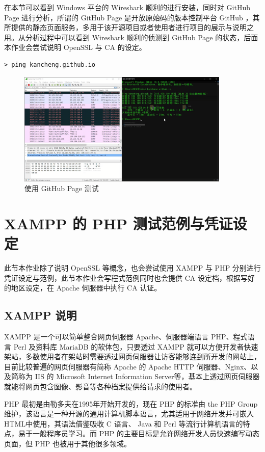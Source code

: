 在本节可以看到 Windows 平台的 Wireshark 顺利的进行安装，同时对 GitHub Page 进行分析，所谓的 GitHub Page 是开放原始码的版本控制平台 GitHub ，其所提供的静态页面服务，多用于该开源项目或者使用者进行项目的展示与说明之用。从分析过程中可以看到 Wireshark 顺利的侦测到 GitHub Page 的状态，后面本作业会尝试说明 OpenSSL 与 CA 的设定。

\begin{Verbatim}
> ping kancheng.github.io
\end{Verbatim}

\begin{figure}[htb]
\centering 
\includegraphics[width=0.90\textwidth]{img/ch1s1m11.png} 
\caption{使用 GitHub Page 测试}
\label{Test}
\end{figure}


\section{XAMPP 的 PHP 测试范例与凭证设定}

此节本作业除了说明 OpenSSL 等概念，也会尝试使用 XAMPP 与 PHP 分别进行凭证设定与范例，此节本作业会写程式范例同时也会提供 CA 设定档，根据写好的地区设定，在 Apache 伺服器中执行 CA 认证。

\subsection{XAMPP 说明}

XAMPP 是一个可以简单整合网页伺服器 Apache、伺服器端语言 PHP、程式语言 Perl 及资料库 MariaDB 的软体包，只要透过 XAMPP 就可以方便开发者快速架站，多数使用者在架站时需要透过网页伺服器让访客能够连到所开发的网站上，目前比较普遍的网页伺服器有简称 Apache 的 Apache HTTP 伺服器、Nginx、以及简称为 IIS 的 Microsoft Internet Information Server等，基本上透过网页伺服器就能将网页包含图像、影音等各种档案提供给请求的使用者。

PHP 最初是由勒多夫在1995年开始开发的，现在 PHP 的标准由 the PHP Group 维护，该语言是一种开源的通用计算机脚本语言，尤其适用于网络开发并可嵌入HTML中使用，其语法借鉴吸收 C 语言、 Java 和 Perl 等流行计算机语言的特点，易于一般程序员学习。而 PHP 的主要目标是允许网络开发人员快速编写动态页面，但 PHP 也被用于其他很多领域。

